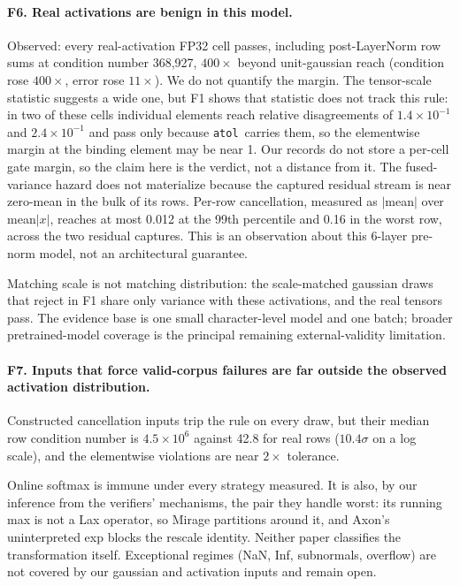 \documentclass[twocolumn,10pt]{article}
\newcommand{\atol}{\texttt{atol}}
\newcommand{\e}[2]{$#1\times10^{#2}$}
\begin{document}
\paragraph{F6. Real activations are benign in this model.} Observed:
every real-activation FP32 cell passes, including post-LayerNorm row
sums at condition number 368{,}927, $400\times$ beyond unit-gaussian
reach (condition rose $400\times$, error rose $11\times$). We do not
quantify the margin. The tensor-scale statistic suggests a wide one, but
F1 shows that statistic does not track this rule: in two of these cells
individual elements reach relative disagreements of \e{1.4}{-1} and
\e{2.4}{-1} and pass only because \atol\ carries them, so the
elementwise margin at the binding element may be near 1. Our records do
not store a per-cell gate margin, so the claim here is the verdict, not
a distance from it. The fused-variance hazard does not materialize
because the captured residual stream is near zero-mean in the bulk of
its rows. Per-row cancellation, measured as $|$mean$|$ over mean$|x|$,
reaches at most 0.012 at the 99th percentile and 0.16 in the worst row,
across the two residual captures. This is an observation about this
6-layer pre-norm model, not an architectural guarantee.

Matching scale is not matching distribution: the scale-matched gaussian
draws that reject in F1 share only variance with these activations, and
the real tensors pass. The evidence base is one small character-level
model and one batch; broader pretrained-model coverage is the principal
remaining external-validity limitation.

\paragraph{F7. Inputs that force valid-corpus failures are far outside
the observed activation distribution.} Constructed cancellation inputs
trip the rule on every draw, but their median row condition number is
\e{4.5}{6} against 42.8 for real rows ($10.4\sigma$ on a log scale), and
the elementwise violations are near $2\times$ tolerance.

Online softmax is immune under every strategy measured. It is also, by
our inference from the verifiers' mechanisms, the pair they handle
worst: its running max is not a Lax operator, so Mirage partitions
around it, and Axon's uninterpreted exp blocks the rescale identity.
Neither paper classifies the transformation itself. Exceptional regimes
(NaN, Inf, subnormals, overflow) are not covered by our gaussian and
activation inputs and remain open.
\end{document}
